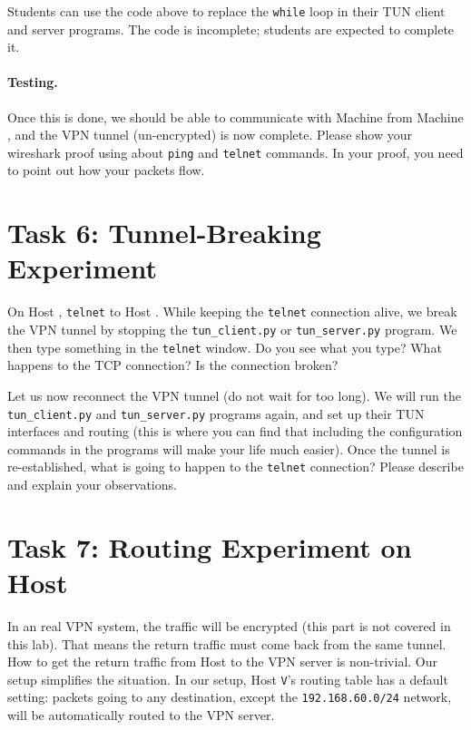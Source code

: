 Students can use the code above to replace the \texttt{while} loop
in their TUN client and server programs. The code is incomplete; students
are expected to complete it. 


\paragraph{Testing.} 
Once this is done, we should be able to communicate with Machine \hostv
from Machine \hostu, and the VPN tunnel (un-encrypted) is now complete. 
Please show your wireshark proof using about \texttt{ping} and
\texttt{telnet} commands. In your proof, you need to point out how your 
packets flow.



\section{Task 6:  Tunnel-Breaking Experiment}


On Host \hostu, \texttt{telnet} to Host \hostv. While keeping the
\texttt{telnet} connection alive, we break the VPN tunnel by stopping 
the \texttt{tun\_client.py} or \texttt{tun\_server.py} program.  
We then type something
in the \texttt{telnet} window. Do you see what you type? 
What happens to the TCP connection? Is the connection broken? 


Let us now reconnect the VPN tunnel (do not wait for too long). We will run the 
\texttt{tun\_client.py} and \texttt{tun\_server.py} programs again, and 
set up their TUN interfaces and routing (this is where 
you can find that including the configuration commands in the programs will
make your life much easier). Once the tunnel is re-established,
what is going to happen to the
\texttt{telnet} connection?  Please describe and explain your observations.




\section{Task 7: Routing Experiment on Host \hostv}

In an real VPN system, the traffic will be encrypted (this part is not covered
in this lab). That means the return traffic must come back
from the same tunnel. How to get the return traffic from Host \hostv to the VPN server
is non-trivial. Our setup simplifies the situation. In our setup, 
Host \texttt{V}'s routing table has a default setting: packets going to
any destination, except the \texttt{192.168.60.0/24} network,   
will be automatically routed to the VPN server.  

